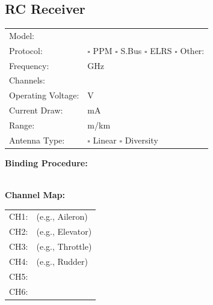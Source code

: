 \documentclass[10pt,letterpaper]{article}
\begin{document}
\subsection*{RC Receiver}
\begin{tabularx}{\textwidth}{lX}
Model: & \underline{\hspace{8cm}} \\
Protocol: & $\square$ PPM $\square$ S.Bus $\square$ ELRS $\square$ Other: \underline{\hspace{2cm}} \\
Frequency: & \underline{\hspace{4cm}} GHz \\
Channels: & \underline{\hspace{4cm}} \\
Operating Voltage: & \underline{\hspace{4cm}} V \\
Current Draw: & \underline{\hspace{4cm}} mA \\
Range: & \underline{\hspace{4cm}} m/km \\
Antenna Type: & $\square$ Linear $\square$ Diversity \\
\end{tabularx}

\textbf{Binding Procedure:}\\
\underline{\hspace{\textwidth}}\\
\underline{\hspace{\textwidth}}

\textbf{Channel Map:}
\begin{tabularx}{\textwidth}{lX}
CH1: & \underline{\hspace{4cm}} (e.g., Aileron) \\
CH2: & \underline{\hspace{4cm}} (e.g., Elevator) \\
CH3: & \underline{\hspace{4cm}} (e.g., Throttle) \\
CH4: & \underline{\hspace{4cm}} (e.g., Rudder) \\
CH5: & \underline{\hspace{4cm}} \\
CH6: & \underline{\hspace{4cm}} \\
\end{tabularx}
\end{document}
